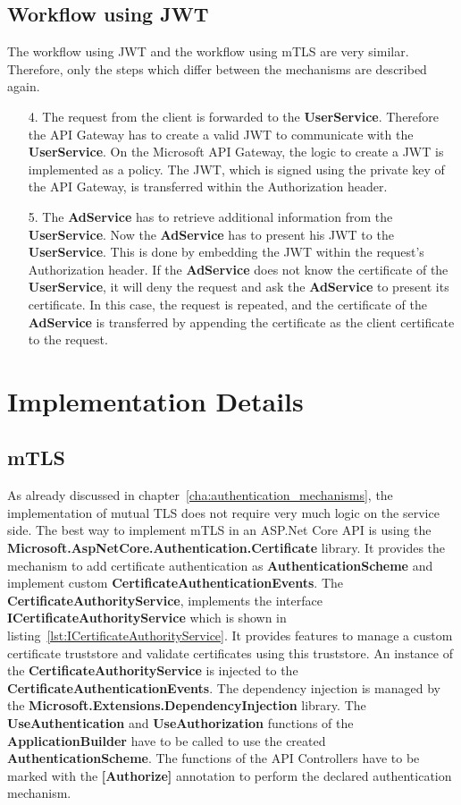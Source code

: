 \subsection{Workflow using JWT}
The workflow using JWT and the workflow using mTLS are very similar. Therefore, only the steps which differ between the mechanisms are described again.
\begin{enumerate}
	\item[4.] The request from the client is forwarded to the \textbf{UserService}. 
		Therefore the API Gateway has to create a valid JWT to communicate with the \textbf{UserService}.
		On the Microsoft API Gateway, the logic to create a JWT is implemented as a policy.
		The JWT, which is signed using the private key of the API Gateway, is transferred within the Authorization header.
	\item[5.] The \textbf{AdService} has to retrieve additional information from the \textbf{UserService}.
		Now the \textbf{AdService} has to present his JWT to the \textbf{UserService}.
		This is done by embedding the JWT within the request's Authorization header.
		If the \textbf{AdService} does not know the certificate of the \textbf{UserService}, it will deny the request and ask the \textbf{AdService} to present its certificate.
		In this case, the request is repeated, and the certificate of the \textbf{AdService} is transferred by appending the certificate as the client certificate to the request.
\end{enumerate}

\section{Implementation Details}

\subsection{mTLS} \label{sec:impl_details_mtls}
As already discussed in chapter~\ref{cha:authentication_mechanisms}, the implementation of mutual TLS does not require very much logic on the service side.
The best way to implement mTLS in an ASP.Net Core API is using the \textbf{Microsoft.AspNetCore.Authentication.Certificate} library.
It provides the mechanism to add certificate authentication as \textbf{AuthenticationScheme} and implement custom \textbf{CertificateAuthenticationEvents}.
The \textbf{CertificateAuthorityService}, implements the interface \textbf{ICertificateAuthorityService} which is shown in listing~\ref{lst:ICertificateAuthorityService}.
It provides features to manage a custom certificate truststore and validate certificates using this truststore.
An instance of the \textbf{CertificateAuthorityService} is injected to the \textbf{CertificateAuthenticationEvents}.
The dependency injection is managed by the \textbf{Microsoft.Extensions.DependencyInjection} library.
The \textbf{UseAuthentication} and \textbf{UseAuthorization} functions of the \textbf{ApplicationBuilder} have to be called to use the created \textbf{AuthenticationScheme}.
The functions of the API Controllers have to be marked with the \textbf{[Authorize]} annotation to perform the declared authentication mechanism.

